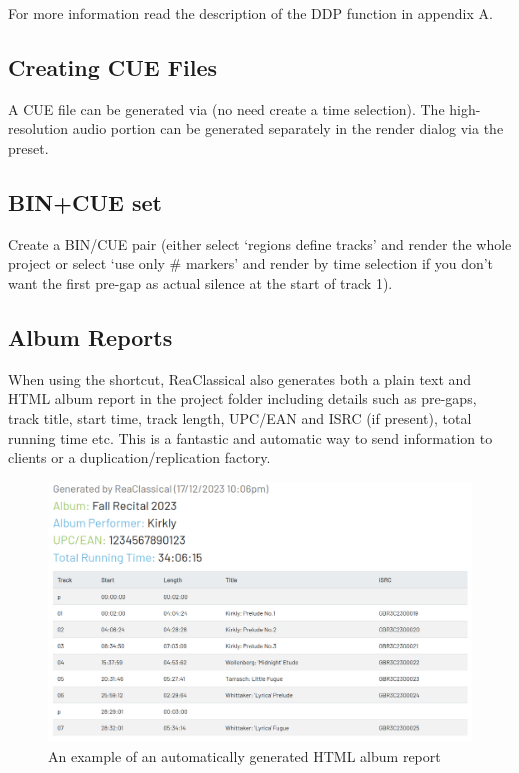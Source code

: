 \documentclass[10pt,american]{article}
\begin{document}
For more information read the description of the DDP function in appendix A.

\subsection{Creating CUE Files}

A CUE file can be generated via  (no need create a time selection). The
high-resolution audio portion can be generated separately in the render dialog
via the preset. 

\subsection{BIN+CUE set}

Create a BIN/CUE pair (either select `regions define tracks\textquoteright{} and
render the whole project or select `use only \# markers' and render by time
selection if you don't want the first pre-gap as actual silence at the start of
track 1). 

\subsection{Album Reports}

When using the  shortcut, ReaClassical also generates both a plain text
and HTML album report in the project folder including details such as pre-gaps,
track title, start time, track length, UPC/EAN and ISRC (if present), total
running time etc. This is a fantastic and automatic way to send information to
clients or a duplication/replication factory.

\begin{figure}
\includegraphics[width=1\linewidth]{user_guide_images/html_album_report}

\caption{An example of an automatically generated HTML album report}

\end{figure}
\end{document}
